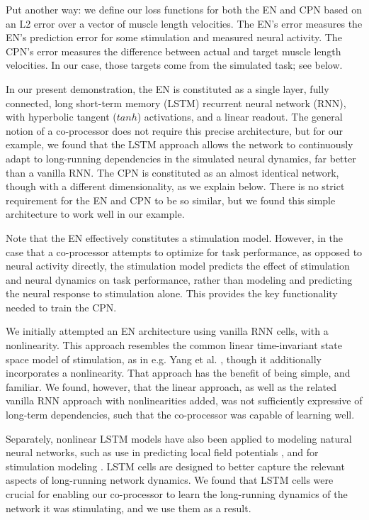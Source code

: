 \documentclass[12pt]{iopart}
\begin{document}
Put another way: we define our loss functions for both the EN and CPN based on an L2 error over
a vector of muscle length velocities. The EN's error measures the EN's prediction error for some
stimulation and measured neural activity. The CPN's error measures the difference between actual
and target muscle length velocities. In our case, those targets come from the simulated task;
see below.

In our present demonstration, the EN is constituted as a single layer, fully connected,
long short-term memory (LSTM) recurrent neural network (RNN), with hyperbolic tangent ($tanh$)
activations, and a linear readout. The general notion of a co-processor does
not require this precise architecture, but for our example, we found that the LSTM
approach allows the network to continuously adapt to long-running dependencies in
the simulated neural dynamics, far better than a vanilla RNN. The CPN is constituted
as an almost identical network, though with a different dimensionality, as we explain
below. There is no strict requirement for the EN and CPN to be so similar, but we
found this simple architecture to work well in our example.

Note that the EN effectively constitutes a stimulation model. However, in the case that
a co-processor attempts to optimize for task performance, as opposed to neural
activity directly, the stimulation model predicts the effect of stimulation and neural
dynamics on task performance, rather than modeling and predicting the neural response
to stimulation alone. This provides the key functionality needed to train the CPN.

We initially attempted an EN architecture using vanilla RNN cells, with a nonlinearity.
This approach resembles the common linear time-invariant state space model of
stimulation, as in e.g. Yang et al. \cite{shanechi.stimmodel}, though it additionally
incorporates a nonlinearity. That approach has the benefit of being simple, and familiar.
We found, however, that the linear approach, as well as the related vanilla RNN
approach with nonlinearities added, was not sufficiently expressive of long-term
dependencies, such that the co-processor was capable of learning well.

Separately, nonlinear LSTM models have also been applied to modeling natural
neural networks, such as use in predicting local field potentials
\cite{kim.lstm}, and for stimulation modeling \cite{guclu.lstm}.
LSTM cells are designed to better capture the relevant aspects of
long-running network dynamics. We found that LSTM cells were crucial for
enabling our co-processor to learn the long-running dynamics of the network
it was stimulating, and we use them as a result.
\end{document}
